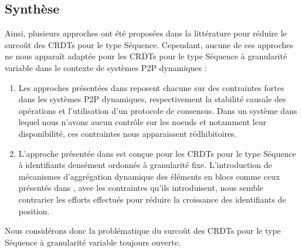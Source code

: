 \subsection{Synthèse}

Ainsi, plusieurs approches ont été proposées dans la littérature pour réduire le surcoût des \acp{CRDT} pour le type Séquence.
Cependant, aucune de ces approches ne nous apparaît adaptée pour les \acp{CRDT} pour le type Séquence à granularité variable dans le contexte de systèmes \ac{P2P} dynamiques :

\begin{enumerate}
    \item Les approches présentées dans \cite{ROH2011354,letia:hal-01248270,zawirski:hal-01248197} reposent chacune sur des contraintes fortes dans les systèmes \ac{P2P} dynamiques, \ie respectivement la stabilité causale des opérations et l'utilisation d'un protocole de consensus.
        Dans un système dans lequel nous n'avons aucun contrôle sur les noeuds et notamment leur disponibilité, ces contraintes nous apparaissent rédhibitoires.
    \item L'approche présentée dans \cite{lseq2013,lseq2017} est conçue pour les \acp{CRDT} pour le type Séquence à identifiants densément ordonnés à granularité fixe.
        L'introduction de mécanismes d'aggrégation dynamique des éléments en blocs comme ceux présentés dans \cite{2013-logootsplit,briot:hal-01343941}, avec les contraintes qu'ils introduisent, nous semble contrarier les efforts effectués pour réduire la croissance des identifiants de position.
\end{enumerate}

Nous considérons donc la problématique du surcoût des \acp{CRDT} pour le type Séquence à granularité variable toujours ouverte.
